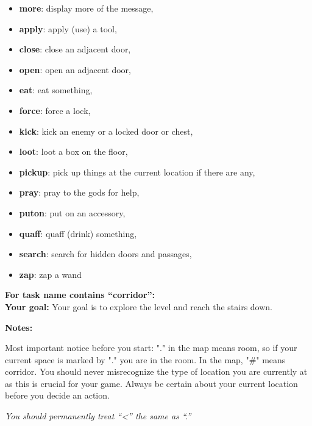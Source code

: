 \begin{MyGreenBox}
\begin{itemize}
		\item \textbf{more}: display more of the message,

		\item \textbf{apply}: apply (use) a tool,

		\item \textbf{close}: close an adjacent door,

		\item \textbf{open}: open an adjacent door,

		\item \textbf{eat}: eat something,

		\item \textbf{force}: force a lock,

		\item \textbf{kick}: kick an enemy or a locked door or chest,

		\item \textbf{loot}: loot a box on the floor,

		\item \textbf{pickup}: pick up things at the current location if there are any,

		\item \textbf{pray}: pray to the gods for help,

		\item \textbf{puton}: put on an accessory,

		\item \textbf{quaff}: quaff (drink) something,

		\item \textbf{search}: search for hidden doors and passages,

		\item \textbf{zap}: zap a wand
	\end{itemize}

	\textbf{For task name contains “corridor”:}\\ \textbf{Your goal:} Your goal is
	to explore the level and reach the stairs down.

	\textbf{Notes:}

	Most important notice before you start: "." in the map means room, so if your
	current space is marked by "." you are in the room. In the map, "\#" means
	corridor. You should never misrecognize the type of location you are currently
	at as this is crucial for your game. Always be certain about your current
	location before you decide an action.

	\textit{You should permanently treat “<” the same as “.”}


\end{MyGreenBox}

